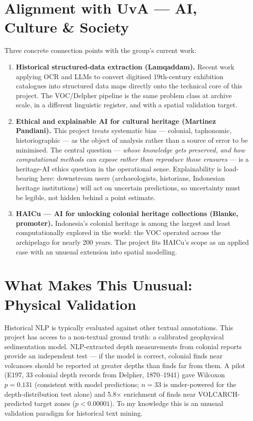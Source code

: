 \documentclass[11pt,a4paper]{article}
\begin{document}
\section{Alignment with UvA --- AI, Culture \& Society}

Three concrete connection points with the group's current work:

\begin{enumerate}[nosep]
  \item \textbf{Historical structured-data extraction (Lamqaddam).} Recent work applying OCR and LLMs to convert digitised 19th-century exhibition catalogues into structured data maps directly onto the technical core of this project. The VOC/Delpher pipeline is the same problem class at archive scale, in a different linguistic register, and with a spatial validation target.
  \item \textbf{Ethical and explainable AI for cultural heritage (Martinez Pandiani).} This project treats systematic bias --- colonial, taphonomic, historiographic --- as the object of analysis rather than a source of error to be minimised. The central question --- \emph{whose knowledge gets preserved, and how computational methods can expose rather than reproduce those erasures} --- is a heritage-AI ethics question in the operational sense. Explainability is load-bearing here: downstream users (archaeologists, historians, Indonesian heritage institutions) will act on uncertain predictions, so uncertainty must be legible, not hidden behind a point estimate.
  \item \textbf{HAICu --- AI for unlocking colonial heritage collections (Blanke, promoter).} Indonesia's colonial heritage is among the largest and least computationally explored in the world: the VOC operated across the archipelago for nearly 200 years. The project fits HAICu's scope as an applied case with an unusual extension into spatial modelling.
\end{enumerate}

\section{What Makes This Unusual: Physical Validation}

Historical NLP is typically evaluated against other textual annotations. This project has access to a non-textual ground truth: a calibrated geophysical sedimentation model. NLP-extracted depth measurements from colonial reports provide an independent test --- if the model is correct, colonial finds near volcanoes should be reported at greater depths than finds far from them. A pilot (E197, 33 colonial depth records from Delpher, 1870--1941) gave Wilcoxon $p=0.131$ (consistent with model predictions; $n=33$ is under-powered for the depth-distribution test alone) and 5.8$\times$ enrichment of finds near VOLCARCH-predicted target zones ($p<0.00001$). To my knowledge this is an unusual validation paradigm for historical text mining.
\end{document}
